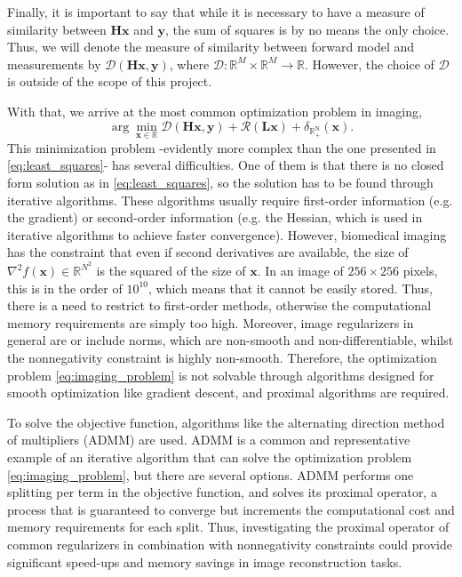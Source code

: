 Finally, it is important to say that while it is necessary to have a measure of similarity between $\mathbf{Hx}$ and $\mathbf{y}$, the sum of squares is by no means the only choice. Thus, we will denote the measure of similarity between forward model and measurements by $\mathcal{D}(\mathbf{Hx}, \mathbf{y})$, where $\mathcal{D}: \mathbb{R}^M \times \mathbb{R}^M \rightarrow \mathbb{R}$. However, the choice of $\mathcal{D}$ is outside of the scope of this project. 

With that, we arrive at the most common optimization problem in imaging,
\begin{equation}
    \arg \min_{\mathbf{x}\in\mathbb{R}}\mathcal{D}(\mathbf{Hx}, \mathbf{y}) +  \mathcal{R}(\mathbf{Lx}) + \delta_{\mathbb{R}_+^\mathrm{N}}(\mathbf{x}).
    \label{eq:imaging_problem}
\end{equation}
This minimization problem -evidently more complex than the one presented in  \eqref{eq:least_squares}- has several difficulties. One of them is that there is no closed form solution as in \eqref{eq:least_squares}, so the solution has to be found through iterative algorithms. These algorithms usually require first-order information (e.g. the gradient) or second-order information (e.g. the Hessian, which is used in iterative algorithms to achieve faster convergence). However, biomedical imaging has the constraint that even if second derivatives are available, the size of $\nabla^2f(\mathbf{x}) \in \mathbb{R}^{N^2}$ is the squared of the size of $\mathbf{x}$. In an image of $256\times 256$ pixels, this is in the order of $10^{10}$, which means that it cannot be easily stored. Thus, there is a need to restrict to first-order methods, otherwise the computational memory requirements are simply too high. Moreover, image regularizers in general are or include norms, which are non-smooth and non-differentiable, whilst the nonnegativity constraint is highly non-smooth. Therefore, the optimization problem \eqref{eq:imaging_problem} is not solvable through algorithms designed for smooth optimization like gradient descent, and proximal algorithms are required. 

To solve the objective function, algorithms like the alternating direction method of multipliers (ADMM) are used. ADMM is a common and representative example of an iterative algorithm that can solve the optimization problem \eqref{eq:imaging_problem}, but there are several options. ADMM performs one splitting per term in the objective function, and solves its proximal operator, a process that is guaranteed to converge but increments the computational cost and memory requirements for each split. Thus, investigating the proximal operator of common regularizers in combination with nonnegativity constraints could provide significant speed-ups and memory savings in image reconstruction tasks. %

